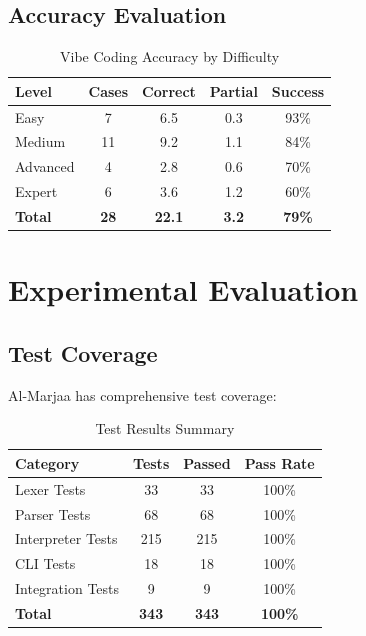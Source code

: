 \documentclass[11pt,a4paper]{article}
\begin{document}
\subsection{Accuracy Evaluation}

\begin{table}[h]
\centering
\caption{Vibe Coding Accuracy by Difficulty}
\label{tab:vibe-accuracy}
\begin{tabular}{@{}lcccc@{}}
\toprule
\textbf{Level} & \textbf{Cases} & \textbf{Correct} & \textbf{Partial} & \textbf{Success} \\
\midrule
Easy & 7 & 6.5 & 0.3 & 93\% \\
Medium & 11 & 9.2 & 1.1 & 84\% \\
Advanced & 4 & 2.8 & 0.6 & 70\% \\
Expert & 6 & 3.6 & 1.2 & 60\% \\
\midrule
\textbf{Total} & \textbf{28} & \textbf{22.1} & \textbf{3.2} & \textbf{79\%} \\
\bottomrule
\end{tabular}
\end{table}

\section{Experimental Evaluation}
\label{sec:evaluation}

\subsection{Test Coverage}

Al-Marjaa has comprehensive test coverage:

\begin{table}[h]
\centering
\caption{Test Results Summary}
\label{tab:tests}
\begin{tabular}{@{}lccc@{}}
\toprule
\textbf{Category} & \textbf{Tests} & \textbf{Passed} & \textbf{Pass Rate} \\
\midrule
Lexer Tests & 33 & 33 & 100\% \\
Parser Tests & 68 & 68 & 100\% \\
Interpreter Tests & 215 & 215 & 100\% \\
CLI Tests & 18 & 18 & 100\% \\
Integration Tests & 9 & 9 & 100\% \\
\midrule
\textbf{Total} & \textbf{343} & \textbf{343} & \textbf{100\%} \\
\bottomrule
\end{tabular}
\end{table}
\end{document}
